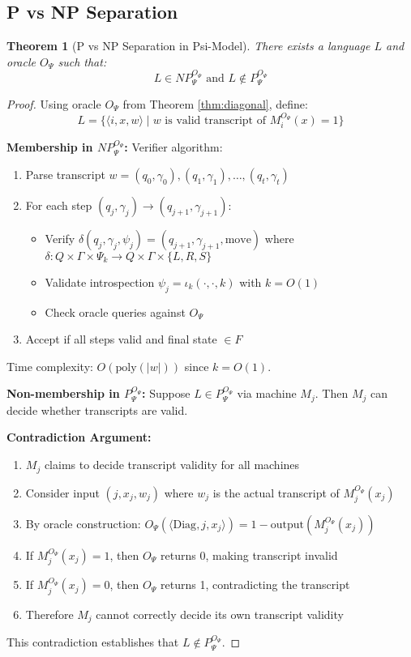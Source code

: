 \documentclass[11pt]{article}
\newtheorem{theorem}{Theorem}[section]
\theoremstyle{definition}
\begin{document}
\subsection{P vs NP Separation}

\begin{theorem}[P vs NP Separation in Psi-Model]
\label{thm:separation}
There exists a language $L$ and oracle $O_\Psi$ such that:
$$L \in NP^{O_\Psi}_\Psi \text{ and } L \notin P^{O_\Psi}_\Psi$$
\end{theorem}

\begin{proof}
Using oracle $O_\Psi$ from Theorem \ref{thm:diagonal}, define:
$$L = \{\langle i, x, w \rangle \mid w \text{ is valid transcript of } M_i^{O_\Psi}(x) = 1\}$$

\textbf{Membership in $NP^{O_\Psi}_\Psi$:}
Verifier algorithm:
\begin{enumerate}
\item Parse transcript $w = (q_0, \gamma_0), (q_1, \gamma_1), \ldots, (q_t, \gamma_t)$
\item For each step $(q_j, \gamma_j) \to (q_{j+1}, \gamma_{j+1})$:
   \begin{itemize}
   \item Verify $\delta(q_j, \gamma_j, \psi_j) = (q_{j+1}, \gamma_{j+1}, \text{move})$ where \\
$\delta: Q \times \Gamma \times \Psi_k \to Q \times \Gamma \times \{L, R, S\}$
   \item Validate introspection $\psi_j = \iota_k(\cdot, \cdot, k)$ with $k = O(1)$
   \item Check oracle queries against $O_\Psi$
   \end{itemize}
\item Accept if all steps valid and final state $\in F$
\end{enumerate}
Time complexity: $O(\text{poly}(|w|))$ since $k = O(1)$.

\textbf{Non-membership in $P^{O_\Psi}_\Psi$:}
Suppose $L \in P^{O_\Psi}_\Psi$ via machine $M_j$. Then $M_j$ can decide whether transcripts are valid.

\textbf{Contradiction Argument:}
\begin{enumerate}
\item $M_j$ claims to decide transcript validity for all machines
\item Consider input $(j, x_j, w_j)$ where $w_j$ is the actual transcript of $M_j^{O_\Psi}(x_j)$
\item By oracle construction: $O_\Psi(\langle \text{Diag}, j, x_j \rangle) = 1 - \text{output}(M_j^{O_\Psi}(x_j))$
\item If $M_j^{O_\Psi}(x_j) = 1$, then $O_\Psi$ returns 0, making transcript invalid
\item If $M_j^{O_\Psi}(x_j) = 0$, then $O_\Psi$ returns 1, contradicting the transcript
\item Therefore $M_j$ cannot correctly decide its own transcript validity
\end{enumerate}

This contradiction establishes that $L \notin P^{O_\Psi}_\Psi$.
\end{proof}
\end{document}
